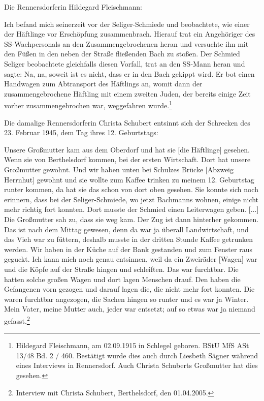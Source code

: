 Die Rennersdorferin Hildegard Fleischmann:
\begin{leftbar}   
Ich befand mich seinerzeit vor der Seliger-Schmiede und beobachtete, wie einer der Häftlinge vor Erschöpfung zusammenbrach. Hierauf trat ein Angehöriger des SS-Wachpersonals an den Zusammengebrochenen heran und versuchte ihn mit den Füßen in den neben der Straße fließenden Bach zu stoßen. Der Schmied Seliger beobachtete gleichfalls diesen Vorfall, trat an den SS-Mann heran und sagte: \glqq Na, na, soweit ist es nicht, dass er in den Bach gekippt wird\grqq. Er bot einen Handwagen zum Abtransport des Häftlings an, womit dann der zusammengebrochene Häftling mit einem zweiten Juden, der bereits einige Zeit vorher zusammengebrochen war, weggefahren wurde.\footnote{Hildegard Fleischmann, am 02.09.1915 in Schlegel geboren. BStU MfS ASt 13/48 Bd. 2 / 460. Bestätigt wurde dies auch durch Liesbeth Sägner während eines Interviews in Rennersdorf. Auch Christa Schuberts Großmutter hat dies gesehen.}
\end{leftbar}

Die damalige Rennersdorferin Christa Schubert entsinnt sich der Schrecken des 23. Februar 1945, dem Tag ihres 12. Geburtstags:

\begin{leftbar}   
Unsere Großmutter kam aus dem Oberdorf und hat sie [die Häftlinge] gesehen. Wenn sie von Berthelsdorf kommen, bei der ersten Wirtschaft. Dort hat unsere Großmutter gewohnt. Und wir haben unten bei Schulzes Brücke [Abzweig Herrnhut] gewohnt und sie wollte zum Kaffee trinken zu meinem 12. Geburtstag runter kommen, da hat sie das schon von dort oben gesehen. Sie konnte sich noch erinnern, dass bei der Seliger-Schmiede, wo jetzt Bachmanns wohnen, einige nicht mehr richtig fort konnten. Dort musste der Schmied einen Leiterwagen geben. [...] Die Großmutter sah zu, dass sie weg kam. Der Zug ist dann hinterher gekommen. Das ist nach dem Mittag gewesen, denn da war ja überall Landwirtschaft, und das Vieh war zu füttern, deshalb musste in der dritten Stunde Kaffee getrunken werden. Wir haben in der Küche auf der Bank gestanden und zum Fenster raus geguckt. Ich kann mich noch genau entsinnen, weil da ein Zweiräder [Wagen] war und die Köpfe auf der Straße hingen und schleiften. Das war furchtbar. Die hatten solche großen Wagen und dort lagen Menschen drauf. Den haben die Gefangenen vorn gezogen und darauf lagen die, die nicht mehr fort konnten. Die waren furchtbar angezogen, die Sachen hingen so runter und es war ja Winter.
Mein Vater, meine Mutter auch, jeder war entsetzt; auf so etwas war ja niemand gefasst.\footnote{Interview mit Christa Schubert, Berthelsdorf, den 01.04.2005.}
\end{leftbar}
